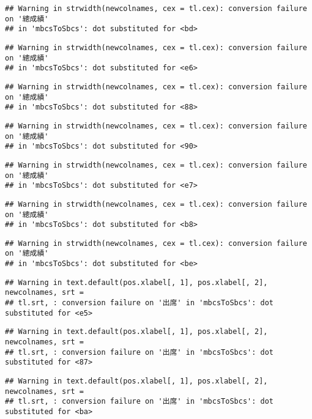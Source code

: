 \documentclass[
]{book}
\begin{document}
\begin{verbatim}
## Warning in strwidth(newcolnames, cex = tl.cex): conversion failure on '總成績'
## in 'mbcsToSbcs': dot substituted for <bd>
\end{verbatim}

\begin{verbatim}
## Warning in strwidth(newcolnames, cex = tl.cex): conversion failure on '總成績'
## in 'mbcsToSbcs': dot substituted for <e6>
\end{verbatim}

\begin{verbatim}
## Warning in strwidth(newcolnames, cex = tl.cex): conversion failure on '總成績'
## in 'mbcsToSbcs': dot substituted for <88>
\end{verbatim}

\begin{verbatim}
## Warning in strwidth(newcolnames, cex = tl.cex): conversion failure on '總成績'
## in 'mbcsToSbcs': dot substituted for <90>
\end{verbatim}

\begin{verbatim}
## Warning in strwidth(newcolnames, cex = tl.cex): conversion failure on '總成績'
## in 'mbcsToSbcs': dot substituted for <e7>
\end{verbatim}

\begin{verbatim}
## Warning in strwidth(newcolnames, cex = tl.cex): conversion failure on '總成績'
## in 'mbcsToSbcs': dot substituted for <b8>
\end{verbatim}

\begin{verbatim}
## Warning in strwidth(newcolnames, cex = tl.cex): conversion failure on '總成績'
## in 'mbcsToSbcs': dot substituted for <be>
\end{verbatim}

\begin{verbatim}
## Warning in text.default(pos.xlabel[, 1], pos.xlabel[, 2], newcolnames, srt =
## tl.srt, : conversion failure on '出席' in 'mbcsToSbcs': dot substituted for <e5>
\end{verbatim}

\begin{verbatim}
## Warning in text.default(pos.xlabel[, 1], pos.xlabel[, 2], newcolnames, srt =
## tl.srt, : conversion failure on '出席' in 'mbcsToSbcs': dot substituted for <87>
\end{verbatim}

\begin{verbatim}
## Warning in text.default(pos.xlabel[, 1], pos.xlabel[, 2], newcolnames, srt =
## tl.srt, : conversion failure on '出席' in 'mbcsToSbcs': dot substituted for <ba>
\end{verbatim}
\end{document}
